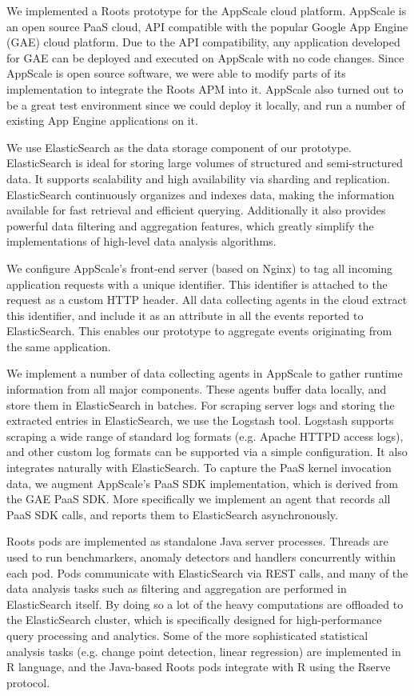 We implemented a Roots prototype for the AppScale cloud platform. AppScale is an open
source PaaS cloud, API compatible with the popular Google App Engine (GAE) cloud platform.
Due to the API compatibility, any application developed for GAE can be deployed
and executed on AppScale with no code changes. Since AppScale is open source software, we
were able to modify parts of its implementation to integrate the Roots APM into it. AppScale also
turned out to be a great test environment since we could deploy it locally, and run a number of
existing App Engine applications on it.

We use ElasticSearch as the data storage component of our prototype. ElasticSearch is ideal 
for storing large volumes of structured and semi-structured data. It supports scalability and 
high availability via sharding and replication.
ElasticSearch continuously organizes and indexes data, making the information available 
for fast retrieval and efficient querying. Additionally it also provides
powerful data filtering and aggregation features, which greatly simplify the implementations of high-level
data analysis algorithms.

We configure AppScale's front-end server (based on Nginx) to tag all incoming application requests
with a unique identifier. This identifier is attached to the request as a custom HTTP header.
All data collecting agents in the cloud extract this identifier, and include it as an attribute
in all the events reported to ElasticSearch. This enables our prototype to aggregate events originating
from the same application.

We implement a number of data collecting agents in AppScale to gather runtime information
from all major components. These agents buffer data locally, and store them in ElasticSearch
in batches. For scraping server logs and storing the extracted entries in ElasticSearch,
we use the Logstash tool. Logstash supports scraping a wide range of standard log formats (e.g. 
Apache HTTPD access logs), and other custom log formats can be supported via a simple configuration.
It also integrates naturally with ElasticSearch.
To capture the PaaS kernel invocation data, we augment AppScale's PaaS SDK implementation,
which is derived from the GAE PaaS SDK. More specifically we implement an agent that records
all PaaS SDK calls, and reports them to ElasticSearch asynchronously. 

Roots pods are implemented as standalone Java server processes. Threads are used to run benchmarkers,
anomaly detectors and handlers concurrently within each pod. Pods communicate with ElasticSearch via
REST calls, and many of the data analysis tasks such as filtering and aggregation are performed
in ElasticSearch itself. By doing so a lot of the heavy computations are offloaded to the 
ElasticSearch cluster, which is specifically designed for high-performance query processing
and analytics. Some of the more sophisticated statistical analysis tasks (e.g. change point detection, 
linear regression) are implemented in R language,
and the Java-based Roots pods integrate with R using the Rserve protocol.

